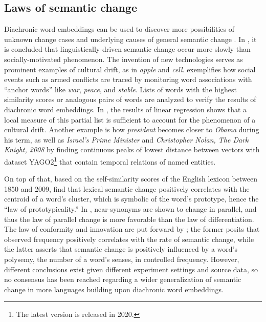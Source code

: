 
\subsection{Laws of semantic change}
Diachronic word embeddings can be used to discover more possibilities of unknown change cases and underlying causes of general semantic change \parencite{hamilton2016cultural,kutuzov2017tracing,heuser2017word}. In \textcite{hamilton2016cultural}, it is concluded that linguistically-driven semantic change occur more slowly than socially-motivated phenomenon. The invention of new technologies serves as prominent examples of cultural drift, as in \textit{apple} and \textit{cell}. \textcite{kutuzov2017tracing} exemplifies how social events such as armed conflicts are traced by monitoring word associations with ``anchor words'' like \textit{war}, \textit{peace}, and \textit{stable}. Lists of words with the highest similarity scores or analogous pairs of words are analyzed to verify the results of diachronic word embeddings. In \textcite{hamilton2016cultural}, the results of linear regression shows that a local measure of this partial list is sufficient to account for the phenomenon of a cultural drift. Another example is how \textit{president} becomes closer to \textit{Obama} during his term, as well as \textit{Israel’s Prime Minister} and \textit{Christopher Nolan, The
Dark Knight, 2008} \parencite{rosin2017learning} by finding continuous peaks of lowest distance between vectors with dataset YAGO2\footnote{The latest version is released in 2020.} that contain temporal relations of named entities.

On top of that, based on the self-similarity scores of the English lexicon between 1850 and 2009, \textcite{dubossarsky2015bottom} find that lexical semantic change positively correlates with the centroid of a word's cluster, which is symbolic of the word's prototype, hence the ``law of prototypicality.'' In \textcite{xu2015computational}, near-synonyms are shown to change in parallel, and thus the law of parallel change is more favorable than the law of differentiation. The law of conformity and innovation are put forward by \textcite{hamilton2016law}; the former posits that observed frequency positively correlates with the rate of semantic change, while the latter asserts that semantic change is positively influenced by a word's polysemy, the number of a word's senses, in controlled frequency. However, different conclusions exist given different experiment settings and source data, so no consensus has been reached regarding a wider generalization of semantic change in more languages building upon diachronic word embeddings.%

